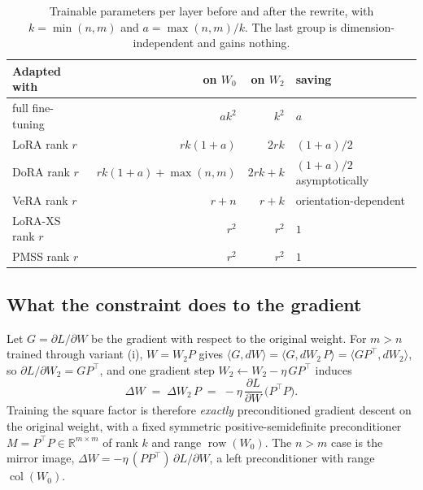 \documentclass{article}
\begin{document}
\begin{table}[t]\centering
\caption{Trainable parameters per layer before and after the rewrite, with
$k=\min(n,m)$ and $a=\max(n,m)/k$. The last group is dimension-independent and
gains nothing.}
\label{tab:acct}
\begin{tabular}{lrrl}
\toprule
Adapted with & on $W_0$ & on $W_2$ & saving \\
\midrule
full fine-tuning  & $ak^2$              & $k^2$    & $a$ \\
LoRA rank $r$     & $rk(1+a)$           & $2rk$    & $(1+a)/2$ \\
DoRA rank $r$     & $rk(1+a)+\max(n,m)$ & $2rk+k$  & $(1+a)/2$ asymptotically \\
VeRA rank $r$     & $r+n$               & $r+k$    & orientation-dependent \\
\midrule
LoRA-XS rank $r$  & $r^2$               & $r^2$    & $1$ \\
PMSS rank $r$     & $r^2$               & $r^2$    & $1$ \\
\bottomrule
\end{tabular}
\end{table}

\subsection{What the constraint does to the gradient}
Let $G=\partial L/\partial W$ be the gradient with respect to the original
weight. For $m>n$ trained through variant (i), $W=W_2P$ gives
$\langle G,dW\rangle=\langle G,dW_2\,P\rangle=\langle GP^{\top},dW_2\rangle$, so
$\partial L/\partial W_2=GP^{\top}$, and one gradient step
$W_2\leftarrow W_2-\eta\,GP^{\top}$ induces
\begin{equation}
  \Delta W \;=\; \Delta W_2\,P \;=\; -\eta\,\frac{\partial L}{\partial W}\,\bigl(P^{\top}P\bigr).
  \label{eq:precond}
\end{equation}
Training the square factor is therefore \emph{exactly} preconditioned gradient
descent on the original weight, with a fixed symmetric positive-semidefinite
preconditioner $M=P^{\top}P\in\mathbb{R}^{m\times m}$ of rank $k$ and range
$\operatorname{row}(W_0)$. The $n>m$ case is the mirror image,
$\Delta W=-\eta\,(PP^{\top})\,\partial L/\partial W$, a left preconditioner with
range $\operatorname{col}(W_0)$.
\end{document}
